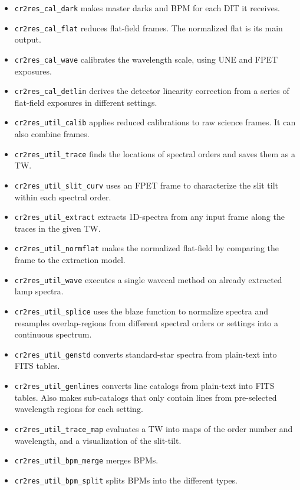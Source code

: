 \begin{itemize}
    \item \texttt{cr2res\_cal\_dark} makes master darks and BPM for each DIT it
    receives.
    \item \texttt{cr2res\_cal\_flat} reduces flat-field frames. The normalized
    flat is its main output.
    \item \texttt{cr2res\_cal\_wave} calibrates the wavelength scale, using UNE
    and FPET exposures.
    \item \texttt{cr2res\_cal\_detlin} derives the detector linearity correction
    from a series of flat-field exposures in different settings.
    \item \texttt{cr2res\_util\_calib} applies reduced calibrations to raw
    science frames. It can also combine frames.
    \item \texttt{cr2res\_util\_trace} finds the locations of spectral orders
    and saves them as a TW.
    \item \texttt{cr2res\_util\_slit\_curv} uses an FPET frame to characterize
    the slit tilt within each spectral order.
    \item \texttt{cr2res\_util\_extract} extracts 1D-spectra from any input frame
    along the traces in the given TW.
    \item \texttt{cr2res\_util\_normflat} makes the normalized flat-field by
    comparing the frame to the extraction model.
    \item \texttt{cr2res\_util\_wave} executes a single wavecal method on
    already extracted lamp spectra.
    \item \texttt{cr2res\_util\_splice} uses the blaze function to normalize
    spectra and resamples overlap-regions from different spectral orders or
    settings into a continuous spectrum.
    \item \texttt{cr2res\_util\_genstd} converts standard-star spectra from
    plain-text into FITS tables.
    \item \texttt{cr2res\_util\_genlines} converts line catalogs from plain-text
    into FITS tables. Also makes sub-catalogs that only contain lines from
    pre-selected wavelength regions for each setting.
    \item \texttt{cr2res\_util\_trace\_map} evaluates a TW into maps of the
    order number and wavelength, and a visualization of the slit-tilt.
    \item \texttt{cr2res\_util\_bpm\_merge} merges BPMs.
    \item \texttt{cr2res\_util\_bpm\_split} splits BPMs into the different
    types.
\end{itemize}

